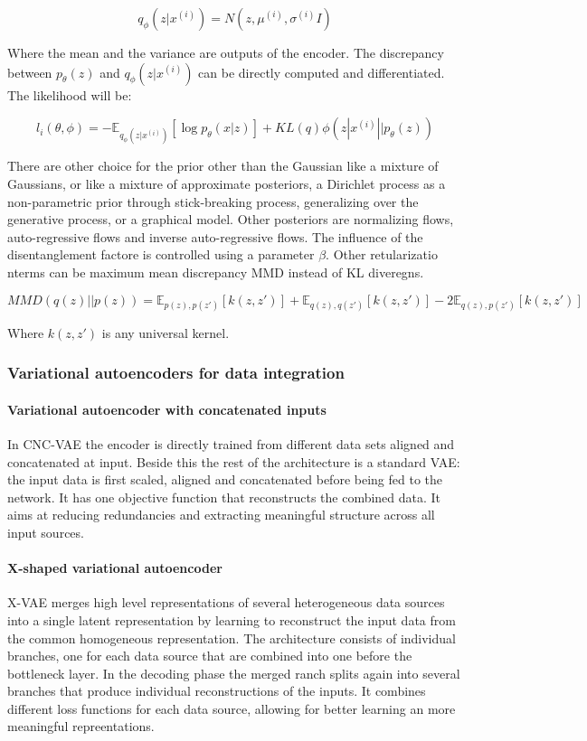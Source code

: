 		$$q_\phi(z|x^{(i)}) = N(z, \mu^{(i)}, \sigma^{(i)} I)$$

		Where the mean and the variance are outputs of the encoder.
		The discrepancy between $p_\theta(z)$ and $q_\phi(z|x^{(i)})$ can be directly computed and differentiated.
		The likelihood will be:

		$$l_i(\theta, \phi) = -\mathbb{E}_{q_\phi(z|x^{(i)})}[\log p_\theta(x|z)] + KL(q)\phi(z|x^{(i)}||p_\theta(z))$$

		There are other choice for the prior other than the Gaussian like a mixture of Gaussians, or like a mixture of approximate posteriors, a Dirichlet process as a non-parametric prior through stick-breaking process, generalizing over the generative process, or a graphical model.
		Other posteriors are normalizing flows, auto-regressive flows and inverse auto-regressive flows.
		The influence of the disentanglement factore is controlled using a parameter $\beta$.
		Other retularizatio nterms can be maximum mean discrepancy MMD instead of KL diveregns.

		$$MMD(q(z)||p(z)) = \mathbb{E}_{p(z), p(z')}[k(z, z')] + \mathbb{E}_{q(z), q(z')}[k(z, z')] -2\mathbb{E}_{q(z), p(z')}[k(z, z')]$$

		Where $k(z, z')$ is any universal kernel.

		\subsubsection{Variational autoencoders for data integration}

			\paragraph{Variational autoencoder with concatenated inputs}
			In CNC-VAE the encoder is directly trained from different data sets aligned and concatenated at input.
			Beside this the rest of the architecture is a standard VAE: the input data is first scaled, aligned and concatenated before being fed to the network.
			It has one objective function that reconstructs the combined data.
			It aims at reducing redundancies and extracting meaningful structure across all input sources.

			\paragraph{X-shaped variational autoencoder}
			X-VAE merges high level representations of several heterogeneous data sources into a single latent representation by learning to reconstruct the input data from the common homogeneous representation.
			The architecture consists of individual branches, one for each data source that are combined into one before the bottleneck layer.
			In the decoding phase the merged ranch splits again into several branches that produce individual reconstructions of the inputs.
			It combines different loss functions for each data source, allowing for better learning an more meaningful repreentations.

